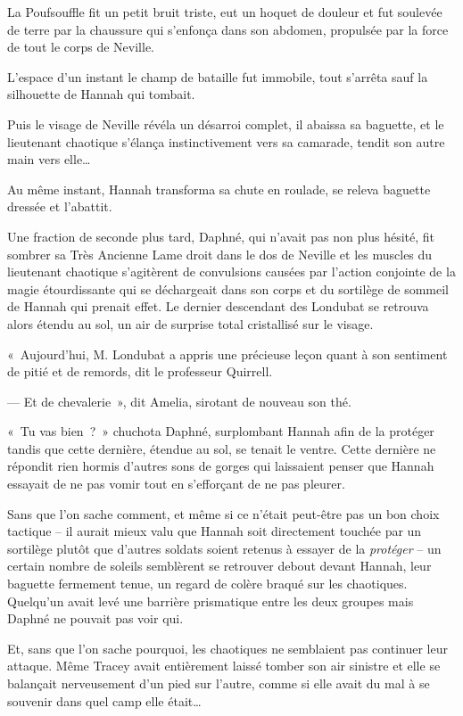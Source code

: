 La Poufsouffle fit un petit bruit triste, eut un hoquet de douleur et fut soulevée de terre par la chaussure qui s'enfonça dans son abdomen, propulsée par la force de tout le corps de Neville.

L'espace d'un instant le champ de bataille fut immobile, tout s'arrêta sauf la silhouette de Hannah qui tombait.

Puis le visage de Neville révéla un désarroi complet, il abaissa sa baguette, et le lieutenant chaotique s'élança instinctivement vers sa camarade, tendit son autre main vers elle…

Au même instant, Hannah transforma sa chute en roulade, se releva baguette dressée et l'abattit.

Une fraction de seconde plus tard, Daphné, qui n'avait pas non plus hésité, fit sombrer sa Très Ancienne Lame droit dans le dos de Neville et les muscles du lieutenant chaotique s'agitèrent de convulsions causées par l'action conjointe de la magie étourdissante qui se déchargeait dans son corps et du sortilège de sommeil de Hannah qui prenait effet. Le dernier descendant des Londubat se retrouva alors étendu au sol, un air de surprise total cristallisé sur le visage.

\later

«~Aujourd'hui, M. Londubat a appris une précieuse leçon quant à son sentiment de pitié et de remords, dit le professeur Quirrell.

--- Et de chevalerie~», dit Amelia, sirotant de nouveau son thé.

\later

«~Tu vas bien~?~» chuchota Daphné, surplombant Hannah afin de la protéger tandis que cette dernière, étendue au sol, se tenait le ventre. Cette dernière ne répondit rien hormis d'autres sons de gorges qui laissaient penser que Hannah essayait de ne pas vomir tout en s'efforçant de ne pas pleurer.

Sans que l'on sache comment, et même si ce n'était peut-être pas un bon choix tactique -- il aurait mieux valu que Hannah soit directement touchée par un sortilège plutôt que d'autres soldats soient retenus à essayer de la \emph{protéger} -- un certain nombre de soleils semblèrent se retrouver debout devant Hannah, leur baguette fermement tenue, un regard de colère braqué sur les chaotiques. Quelqu'un avait levé une barrière prismatique entre les deux groupes mais Daphné ne pouvait pas voir qui.

Et, sans que l'on sache pourquoi, les chaotiques ne semblaient pas continuer leur attaque. Même Tracey avait entièrement laissé tomber son air sinistre et elle se balançait nerveusement d'un pied sur l'autre, comme si elle avait du mal à se souvenir dans quel camp elle était…

